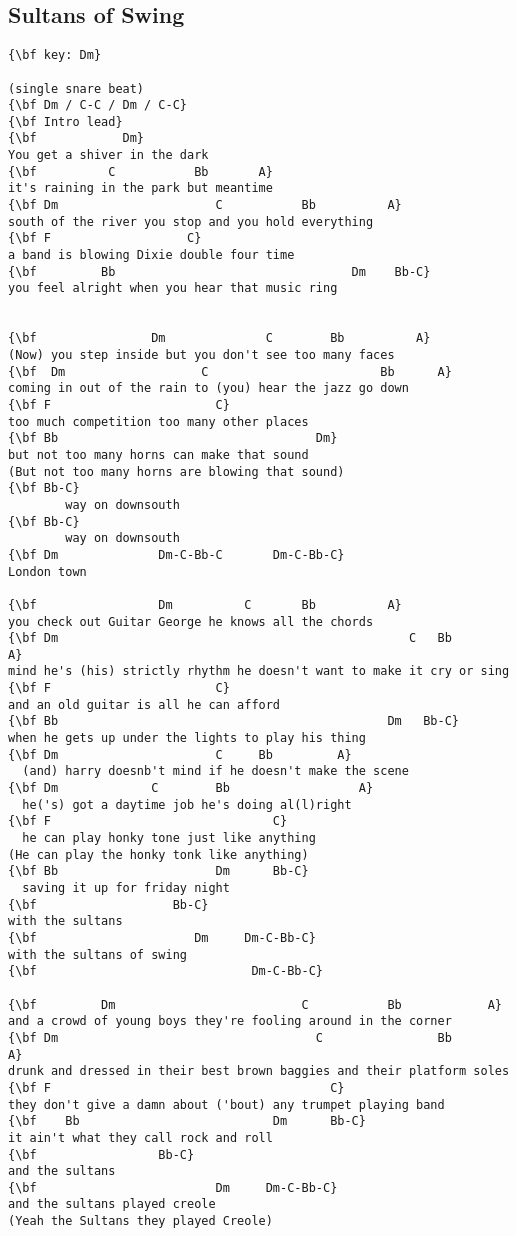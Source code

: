 \documentclass[a4paper]{article}
\begin{document}
\subsection{Sultans of Swing} %
\label{sub:Sultans of Swing}
\begin{Verbatim}[commandchars=\\\{\}]
{\bf key: Dm}

(single snare beat)
{\bf Dm / C-C / Dm / C-C}
{\bf Intro lead}
{\bf            Dm}
You get a shiver in the dark
{\bf          C           Bb       A}
it's raining in the park but meantime
{\bf Dm                      C           Bb          A}
south of the river you stop and you hold everything
{\bf F                   C}
a band is blowing Dixie double four time
{\bf         Bb                                 Dm    Bb-C}
you feel alright when you hear that music ring


{\bf                Dm              C        Bb          A}
(Now) you step inside but you don't see too many faces
{\bf  Dm                   C                        Bb      A}
coming in out of the rain to (you) hear the jazz go down
{\bf F                       C}
too much competition too many other places
{\bf Bb                                    Dm}
but not too many horns can make that sound
(But not too many horns are blowing that sound)
{\bf Bb-C}
        way on downsouth
{\bf Bb-C}
        way on downsouth
{\bf Dm              Dm-C-Bb-C       Dm-C-Bb-C}
London town

{\bf                 Dm          C       Bb          A}
you check out Guitar George he knows all the chords
{\bf Dm                                                 C   Bb             A}
mind he's (his) strictly rhythm he doesn't want to make it cry or sing
{\bf F                       C}
and an old guitar is all he can afford
{\bf Bb                                              Dm   Bb-C}
when he gets up under the lights to play his thing
{\bf Dm                      C     Bb         A}
  (and) harry doesnb't mind if he doesn't make the scene
{\bf Dm             C        Bb                  A}
  he('s) got a daytime job he's doing al(l)right
{\bf F                               C}
  he can play honky tone just like anything
(He can play the honky tonk like anything)
{\bf Bb                      Dm      Bb-C}
  saving it up for friday night
{\bf                   Bb-C}
with the sultans
{\bf                      Dm     Dm-C-Bb-C}
with the sultans of swing
{\bf                              Dm-C-Bb-C}

{\bf         Dm                          C           Bb            A}
and a crowd of young boys they're fooling around in the corner
{\bf Dm                                    C                Bb           A}
drunk and dressed in their best brown baggies and their platform soles
{\bf F                                       C}
they don't give a damn about ('bout) any trumpet playing band
{\bf    Bb                           Dm      Bb-C}
it ain't what they call rock and roll
{\bf                 Bb-C}
and the sultans
{\bf                         Dm     Dm-C-Bb-C}
and the sultans played creole
(Yeah the Sultans they played Creole)


\end{Verbatim}
\end{document}
